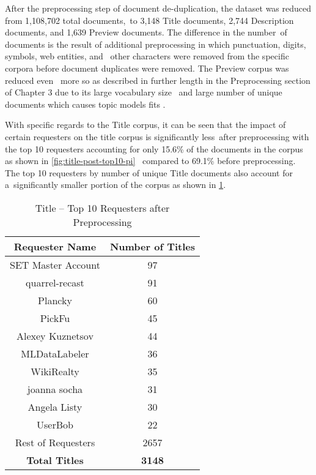 \documentclass[letterpaper,12pt]{article}
\begin{document}
\newpage

After the preprocessing step of document de-duplication, the dataset was reduced from 1,108,702 total documents,\
to 3,148 Title documents, 2,744 Description documents, and 1,639 Preview documents. The difference in the number\
of documents is the result of additional preprocessing in which punctuation, digits, symbols, web entities, and \
other characters were removed from the specific corpora before document duplicates were removed. The Preview corpus was reduced even \ 
more so as described in further length in the Preprocessing section of Chapter 3 due to its large vocabulary size \ 
and large number of unique documents which causes topic models fits \cite{dieng2019topic}.\

With specific regards to the Title corpus, it can be seen that the impact of certain requesters on the title corpus is significantly less\
after preprocessing with the top 10 requesters accounting for only 15.6\% of the documents in the corpus as shown in \ref{fig:title-post-top10-pi} \
compared to 69.1\% before preprocessing. The top 10 requesters by number of unique Title documents also account for a\
significantly smaller portion of the corpus as shown in \ref{tab:title_requester_top_10}.

\begin{table}
	\caption{\label{tab:title_requester_top_10} Title -- Top 10 Requesters after Preprocessing}
	\begin{center}
		\begin{tabular}{| c | c |}
			\hline
			\textbf{Requester Name} &  \textbf{Number of Titles} \\
			\hline
			SET Master Account &              97 \\
			\hline
			quarrel-recast     &              91 \\
			\hline
			Plancky            &              60 \\
			\hline
			PickFu             &              45 \\
			\hline
			Alexey Kuznetsov   &              44 \\
			\hline
			MLDataLabeler      &              36 \\
			\hline
			WikiRealty         &              35 \\
			\hline
			joanna socha       &              31 \\
			\hline
			Angela Listy       &              30 \\
			\hline
			UserBob            &              22 \\
			\hline
			Rest of Requesters &            2657 \\
			\hline
			\textbf{Total Titles} & \textbf{3148} \\
			\hline
		\end{tabular}
	\end{center}
\end{table}
\end{document}
